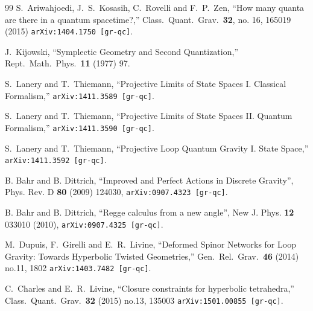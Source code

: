 \documentclass[nofootinbib,superscriptaddress,eqsecnum,tightenlines,11pt]{revtex4-1}
\begin{document}
\begin{thebibliography}{99}
  S.~Ariwahjoedi, J.~S.~Kosasih, C.~Rovelli and F.~P.~Zen,
  ``How many quanta are there in a quantum spacetime?,''
  Class.\ Quant.\ Grav.\  {\bf 32}, no. 16, 165019 (2015)
  \texttt{arXiv:1404.1750 [gr-qc]}.

    J.~Kijowski,
  ``Symplectic Geometry and Second Quantization,''
  Rept.\ Math.\ Phys.\  {\bf 11} (1977) 97.
  
   S.~Lanery and T.~Thiemann,
  ``Projective Limits of State Spaces I. Classical Formalism,''
  \texttt{arXiv:1411.3589 [gr-qc]}.
  
  S.~Lanery and T.~Thiemann,
  ``Projective Limits of State Spaces II. Quantum Formalism,''
  \texttt{arXiv:1411.3590 [gr-qc]}.
  
   S.~Lanery and T.~Thiemann,
  ``Projective Loop Quantum Gravity I. State Space,''
  \texttt{arXiv:1411.3592 [gr-qc]}.
  
 B. Bahr and B. Dittrich,
``Improved and Perfect Actions in Discrete Gravity'',
Phys. Rev. D \textbf{80} (2009) 124030, \texttt{arXiv:0907.4323 [gr-qc]}.

 B. Bahr and B. Dittrich,
``Regge calculus from a new angle'',
New J. Phys. \textbf{12} 033010 (2010), \texttt{arXiv:0907.4325 [gr-qc]}.

  
   M.~Dupuis, F.~Girelli and E.~R.~Livine,
  ``Deformed Spinor Networks for Loop Gravity: Towards Hyperbolic Twisted Geometries,''
  Gen.\ Rel.\ Grav.\  {\bf 46} (2014) no.11,  1802
  \texttt{arXiv:1403.7482 [gr-qc]}.
  
   C.~Charles and E.~R.~Livine,
  ``Closure constraints for hyperbolic tetrahedra,''
  Class.\ Quant.\ Grav.\  {\bf 32} (2015) no.13,  135003
  \texttt{arXiv:1501.00855 [gr-qc]}.
  

\end{thebibliography}
\end{document}
